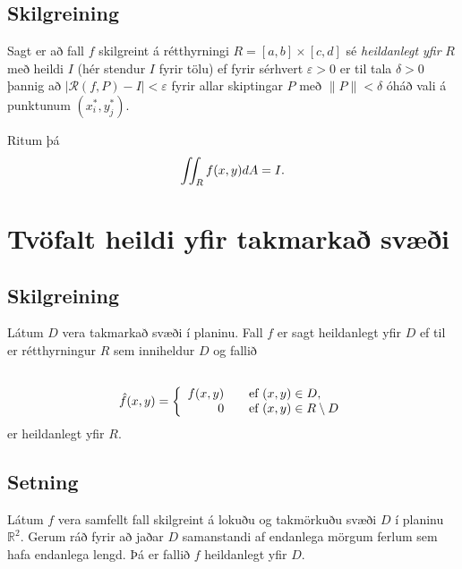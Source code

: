 \documentclass[a4paper,10pt,icelandic]{sphinxmanual}
\begin{document}
\subsection{Skilgreining}
\label{Kafli4:id2}
Sagt er að fall \(f\) skilgreint á rétthyrningi
\(R=[a,b]\times [c,d]\) sé \emph{heildanlegt yfir} \(R\) með heildi
\(I\) (hér stendur \(I\) fyrir tölu) ef fyrir sérhvert
\(\varepsilon>0\) er til tala \(\delta>0\) þannig að
\(|\mathcal{R}(f,P)-I|<\varepsilon\) fyrir allar skiptingar
\(P\) með \(\|P\|<\delta\) óháð vali á punktunum
\((x_i^*, y_j^*)\).

Ritum þá
\begin{gather}
\begin{split}\displaystyle \int\!\!\!\int_R f(x,y)dA=I.\end{split}\notag
\end{gather}

\section{Tvöfalt heildi yfir takmarkað svæði}
\label{Kafli4:tvofalt-heildi-yfir-takmarka-svaei}

\subsection{Skilgreining}
\label{Kafli4:id3}
Látum \(D\) vera takmarkað svæði í planinu. Fall \(f\) er sagt
heildanlegt yfir \(D\) ef til er rétthyrningur \(R\) sem
inniheldur \(D\) og fallið
\begin{gather}
\begin{split}\displaystyle\end{split}\notag\\\begin{split}\hat{f}(x,y)=\left\{\begin{array}{rcl}
f(x,y)& & \mbox{ef }(x,y)\in D,\\
0& & \mbox{ef }(x,y)\in R\setminus D
\end{array}\right.\end{split}\notag
\end{gather}
er heildanlegt yfir \(R\).


\subsection{Setning}
\label{Kafli4:setning}
Látum \(f\) vera samfellt fall skilgreint á lokuðu og takmörkuðu
svæði \(D\) í planinu \({\mathbb  R}^2\). Gerum ráð fyrir að
jaðar \(D\) samanstandi af endanlega mörgum ferlum sem hafa
endanlega lengd. Þá er fallið \(f\) heildanlegt yfir \(D\).
\end{document}
